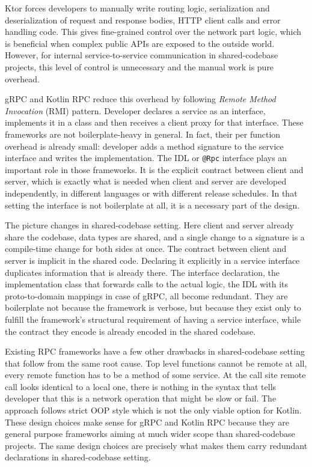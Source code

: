 \documentclass[a4paper,11pt,oneside]{article}
\newcommand{\term}[1]{\textit{#1}}
\newcommand{\kotlini}[1]{\texttt{#1}}
\begin{document}
Ktor forces developers to manually write routing logic, serialization and deserialization of
request and response bodies, HTTP client calls and error handling code. This gives fine-grained
control over the network part logic, which is beneficial when complex public APIs are exposed to
the outside world. However, for internal service-to-service communication in shared-codebase
projects, this level of control is unnecessary and the manual work is pure overhead.

gRPC and Kotlin RPC reduce this overhead by following \term{Remote Method Invocation} (RMI)
pattern. Developer declares a service as an interface, implements it in a class and then receives a
client proxy for that interface. These frameworks are not boilerplate-heavy in general. In fact,
their per function overhead is already small: developer adds a method signature to the service
interface and writes the implementation. The IDL or \kotlini{@Rpc} interface plays an important
role in those frameworks. It is the explicit contract between client and server, which is exactly
what is needed when client and server are developed independently, in different languages or with
different release schedules. In that setting the interface is not boilerplate at all, it is a
necessary part of the design.

The picture changes in shared-codebase setting. Here client and server already share the codebase,
data types are shared, and a single change to a signature is a compile-time change for both sides
at once. The contract between client and server is implicit in the shared code. Declaring it
explicitly in a service interface duplicates information that is already there. The interface
declaration, the implementation class that forwards calls to the actual logic, the IDL with its
proto-to-domain mappings in case of gRPC, all become redundant. They are boilerplate not because
the framework is verbose, but because they exist only to fulfill the framework's structural
requirement of having a service interface, while the contract they encode is already encoded in
the shared codebase.

Existing RPC frameworks have a few other drawbacks in shared-codebase setting that follow from the
same root cause. Top level functions cannot be remote at all, every remote function has to be a
method of some service. At the call site remote call looks identical to a local one, there is
nothing in the syntax that tells developer that this is a network operation that might be slow or
fail. The approach follows strict OOP style which is not the only viable option for Kotlin. These
design choices make sense for gRPC and Kotlin RPC because they are general purpose frameworks
aiming at much wider scope than shared-codebase projects. The same design choices are precisely
what makes them carry redundant declarations in shared-codebase setting.
\end{document}
